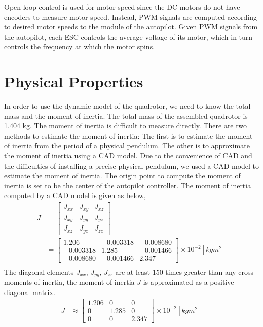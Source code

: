 	Open loop control is used for motor speed since the DC motors do not have encoders to measure motor speed. Instead, PWM signals are computed according to desired motor speeds to the module of the autopilot. Given PWM signals from the autopilot, each ESC controls the average voltage of its motor, which in turn controls the frequency at which the motor spins.

\section{Physical Properties}
	In order to use the dynamic model of the quadrotor, we need to know the total mass and the moment of inertia. The total mass of the assembled quadrotor is 1.404 kg. The moment of inertia is difficult to measure directly. There are two methods to estimate the moment of inertia: The first is to estimate the moment of inertia from the period of a physical pendulum. The other is to approximate the moment of inertia using a CAD model. Due to the convenience of CAD and the difficulties of installing a precise physical pendulum, we used a CAD model to estimate the moment of inertia. The origin point to compute the moment of inertia is set to be the center of the autopilot controller. The moment of inertia computed by a CAD model is given as below,\\
\begin{equation}
\begin{aligned}
J & = 
\begin{bmatrix}
J_{xx} & J_{xy} & J_{xz} \\
J_{xy} & J_{yy} & J_{yz} \\
J_{xz} & J_{yz} & J_{zz}
\end{bmatrix}\\
& = 
\begin{bmatrix}
1.206 & - 0.003318 & -0.008680 \\
- 0.003318 & 1.285 & -0.001466 \\
-0.008680 & -0.001466 & 2.347
\end{bmatrix}
\times {10}^{-2} [\textstyle{kg} {\textstyle{m}}^2]\\
\end{aligned}
\end{equation}
The diagonal elements \(J_{xx}\), \(J_{yy}\), \(J_{zz}\) are at least 150 times greater than any cross moments of inertia, the moment of inertia \(J\) is approximated as a positive diagonal matrix.\\
\begin{equation}
\begin{aligned}
J & \approx 
\begin{bmatrix}
1.206 & 0 & 0 \\
0 & 1.285 & 0 \\
0 & 0 & 2.347
\end{bmatrix}
\times {10}^{-2} [\textstyle{kg} {\textstyle{m}}^2]\\
\end{aligned}
\end{equation}
